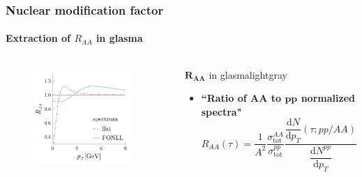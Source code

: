 \documentclass[aspectratio=169,11pt,usenames,dvipsnames]{beamer}
\begin{document}

\begin{frame}
    \frametitle{Nuclear modification factor}
    \framesubtitle{Extraction of $R_{AA}$ in glasma}
    \vspace{-10pt}
    \begin{columns}[onlytextwidth,t]
        \begin{center}
    
            \begin{figure}
                \centering
                \includegraphics[width=0.9\textwidth]{images/final_sketch_raa_gl_fonll_v4_crop_2.png}
            \end{figure}
        \end{center}
        

       \begin{center}
        \begin{custombox}{$\boldsymbol{R_{AA}}$ in glasma}{lightgray}
            \small
            \begin{varwidth}{0.98\textwidth}
            \begin{itemize}
                \itemsep0em
                \item {\bfseries``Ratio of $\boldsymbol{AA}$ to $\boldsymbol{pp}$ normalized spectra"}\\[5pt]
                $R_{AA}(\tau)=\dfrac{1}{A^2}\dfrac{\sigma_\mathrm{tot}^{AA}}{\sigma_\mathrm{tot}^{pp}}\dfrac{\dfrac{\mathrm{d}N}{\mathrm{d}p_T}(\tau;pp/AA)}{\dfrac{\mathrm{d}N^{pp}}{\mathrm{d}p_T}}$
            \end{itemize}
            \end{varwidth}
        \end{custombox}


\end{center}
\end{columns}
\end{frame}
\end{document}
